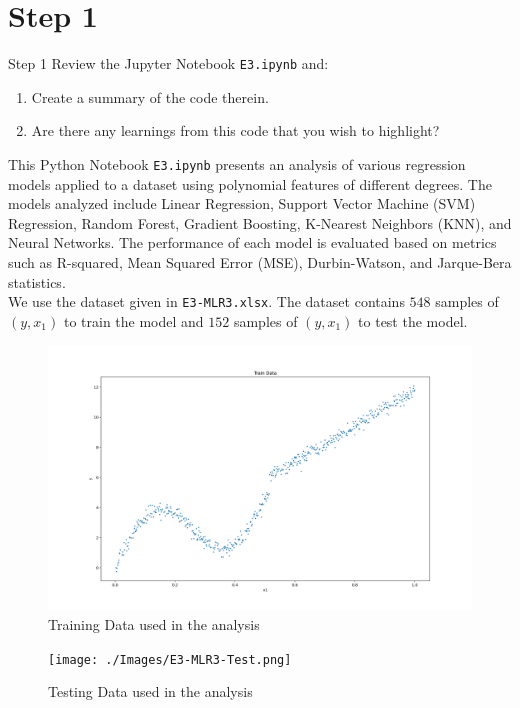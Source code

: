 \section*{Step 1}

\begin{custombox}[label={box:Q1}]{Step 1}
	Review the Jupyter Notebook \verb|E3.ipynb| and:
	\begin{enumerate}[label=(\alph*)]
		\item Create a summary of the code therein.
		\item Are there any learnings from this code that you wish to highlight?
	\end{enumerate}
\end{custombox}

\vspace{5mm}

This Python Notebook \verb|E3.ipynb| presents an analysis of various regression models applied to a dataset using polynomial features of different degrees. The models analyzed include Linear Regression, Support Vector Machine (SVM) Regression, Random Forest, Gradient Boosting, K-Nearest Neighbors (KNN), and Neural Networks. The performance of each model is evaluated based on metrics such as R-squared, Mean Squared Error (MSE), Durbin-Watson, and Jarque-Bera statistics. \\

We use the dataset given in \verb|E3-MLR3.xlsx|. The dataset contains $548$ samples of $(y, x_1)$ to train the model and $152$ samples of $(y, x_1)$ to test the model. 

\begin{figure}[H]
	\centering
	\includegraphics[width=0.7\linewidth]{./Images/E3-MLR3-Train.png}
	\caption{Training Data used in the analysis}
\end{figure}

\begin{figure}[H]
	\centering
	\texttt{[image: ./Images/E3-MLR3-Test.png]}
	\caption{Testing Data used in the analysis}
\end{figure}

